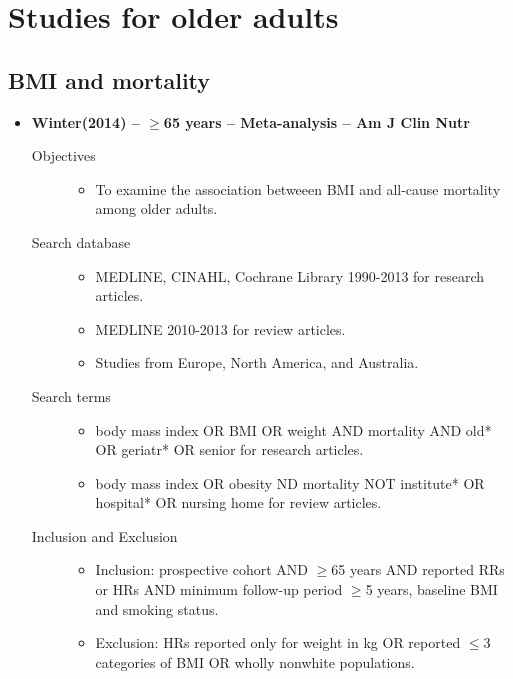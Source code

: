 \documentclass{article}
\begin{document}
\section{Studies for older adults}
\subsection{BMI and mortality}
\begin{itemize}	
	\item{\bf Winter(2014) -- $\geq$65 years -- Meta-analysis -- Am J Clin Nutr} 
		\begin{description}
			\item[Objectives]\mbox{}\par
				\begin{itemize}
					\item To examine the association betweeen BMI and all-cause mortality among older adults.
				\end{itemize}
			\item[Search database] \mbox{}\par
				\begin{itemize}
					\item MEDLINE, CINAHL, Cochrane Library 1990-2013 for research articles. 
					\item MEDLINE 2010-2013 for review articles. 
					\item Studies from Europe, North America, and Australia.
				\end{itemize}
			\item[Search terms]\mbox{}\par
				\begin{itemize}
					\item body mass index OR BMI OR weight AND mortality AND old* OR geriatr* OR senior for research articles. 
					\item body mass index OR obesity ND mortality NOT institute* OR hospital* OR nursing home for review articles.
				\end{itemize}
			\item[Inclusion and Exclusion] \mbox{}\par
				\begin{itemize}
					\item Inclusion: prospective cohort AND $\geq$65 years AND reported RRs or HRs AND minimum follow-up period $\geq$5 years, baseline BMI and smoking status.
					\item Exclusion: HRs reported only for weight in kg OR reported $\le$3 categories of BMI OR wholly nonwhite populations.

\end{itemize}
\end{description}
\end{itemize}
\end{document}
